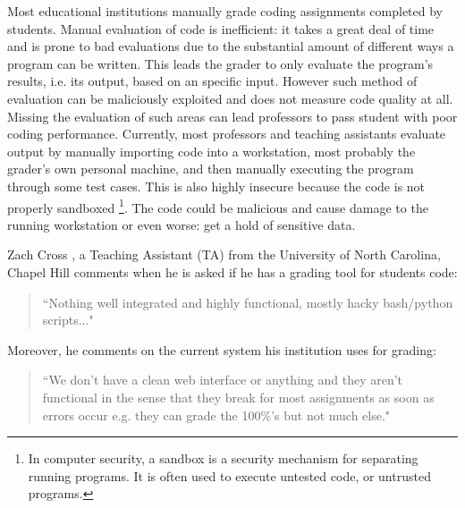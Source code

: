 

Most educational institutions manually grade coding assignments completed by
students. Manual evaluation of code is inefficient: it takes a great deal of
time and is prone to bad evaluations due to the substantial amount of different
ways a program can be written. This leads the grader to only evaluate the
program's results, i.e. its output, based on an specific input. However such
method of evaluation can be maliciously exploited and does not measure code
quality at all. Missing the evaluation of such areas can lead professors to pass
student with poor coding performance. Currently, most professors and teaching
assistants evaluate output by manually importing code into a workstation, most
probably the grader's own personal machine, and then manually executing the
program through some test cases. This is also highly insecure because the code
is not properly sandboxed \footnote{In computer security, a sandbox is a
security mechanism for separating running programs. It is often used to execute
untested code, or untrusted programs.}. The code could be malicious and cause
damage to the running workstation or even worse: get a hold of sensitive data.


Zach Cross \cite{Zach}, a Teaching Assistant (TA) from the University of North Carolina,
Chapel Hill comments when he is asked if he has a grading tool for students
code: \begin{quote} ``Nothing well integrated and highly functional, mostly hacky
bash/python scripts..." \end{quote} Moreover, he comments on the current system
his institution uses for grading: \begin{quote} ``We don't have a clean web
interface or anything and they aren't functional in the sense that they break
for most assignments as soon as errors occur e.g. they can grade the 100\%'s but
not much else." \end{quote}


